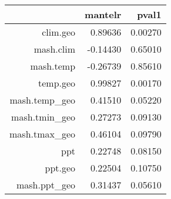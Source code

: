 \begin{table}[ht]
\centering
\begin{tabular}{rrr}
  \hline
 & mantelr & pval1 \\ 
  \hline
clim.geo & 0.89636 & 0.00270 \\ 
  mash.clim & -0.14430 & 0.65010 \\ 
  mash.temp & -0.26739 & 0.85610 \\ 
  temp.geo & 0.99827 & 0.00170 \\ 
  mash.temp\_geo & 0.41510 & 0.05220 \\ 
  mash.tmin\_geo & 0.27273 & 0.09130 \\ 
  mash.tmax\_geo & 0.46104 & 0.09790 \\ 
  ppt & 0.22748 & 0.08150 \\ 
  ppt.geo & 0.22504 & 0.10750 \\ 
  mash.ppt\_geo & 0.31437 & 0.05610 \\ 
   \hline
\end{tabular}
\end{table}
